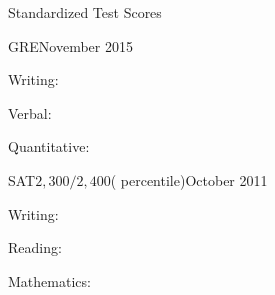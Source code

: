 \documentclass{resume}
\newcommand{\IB}[0]{\DepartmentTitle{IB Coursework}{}}
\newcommand{\Southridge}[0]{\UniversityTitle{Southridge High School}{}}
\begin{document}
  \begin{rSection}{Standardized Test Scores}

  \begin{rSubSection}{GRE}{November 2015}{}{}
  \item Writing:~\tab\tab{}\tab{}
  \item Verbal:~\tab\tab{}\tab{}
  \item Quantitative:~\tab{}\tab{}
  \end{rSubSection}

  \begin{rSubSection}{SAT\hspace{8.9em}$2,300/2,400$\hspace{4.3em}\normalfont( percentile)}{October 2011}{}{}
  \item Writing:~\tab\tab{}\tab{}
  \item Reading:~\tab\tab{}\tab{}
  \item Mathematics:~\tab{}\tab{}
  \end{rSubSection}





\end{rSection}
\end{document}
